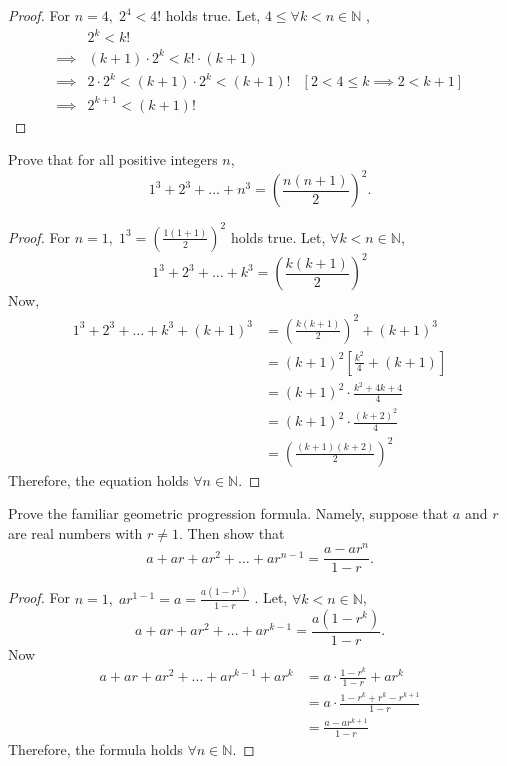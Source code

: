 \documentclass[12pt]{article}
\newenvironment{problem}[2][Problem]{\begin{trivlist}
\item[\hskip \labelsep {\bfseries #1}\hskip \labelsep {\bfseries #2.}]}{\end{trivlist}}
\begin{document}
\begin{proof}
For $n = 4, \; 2^4 < 4!$ holds true. 
Let, $4 \leq \forall k < n \in \mathbb{N}$ , 
\begin{align*}
    & 2^k < k! \\
    \implies & (k+1) \cdot 2^k < k!\cdot (k+1) \\
    \implies & 2\cdot 2^k < (k+1)\cdot 2^k < (k+1)! & [2 < 4 \leq k \implies 2 < k + 1] \\
    \implies & 2^{k+1} < (k+1)!
\end{align*}

\end{proof}

\begin{problem}{6}
Prove that for all positive integers \( n \),
\[
1^3 + 2^3 + \dots + n^3 = \left( \frac{n(n + 1)}{2} \right)^2.
\]

\end{problem}

\begin{proof}
For $n = 1, \; 1^3 = (\frac{1(1+1)}{2})^2$ holds true. 
Let, $\forall k < n \in \mathbb{N}$, 
\[
1^3 + 2^3 + \dots + k^3 = \left( \frac{k(k + 1)}{2} \right)^2
\]
Now, \\
\begin{align*}
    1^3 + 2^3 + \dots + k^3 + (k+1)^3 & = \left( \frac{k(k + 1)}{2} \right)^2 + (k+1)^3 \\
    & = (k+1)^2[\frac{k^2}{4} + (k+1)] \\
    & = (k+1)^2 \cdot \frac{k^2 + 4k +4}{4} \\
    & = (k+1)^2 \cdot \frac{(k+2)^2}{4} \\
    & = \left( \frac{(k+1)(k+2)}{2} \right)^2
\end{align*}
Therefore, the equation holds $\forall n \in \mathbb{N}$.

\end{proof}

\begin{problem}{7}
Prove the familiar geometric progression formula. Namely, suppose that \( a \) and \( r \)
are real numbers with \( r \neq 1 \). Then show that
\[
a + ar + ar^2 + \dots + ar^{n-1} = \frac{a - a r^n}{1 - r}.
\]

\end{problem}

\begin{proof}
For $n = 1, \; ar^{1-1} = a = \frac{a(1-r^1)}{1-r}$ . 
Let, $\forall k < n \in \mathbb{N}$,
\[
a + ar + ar^2 + \dots + ar^{k-1} = \frac{a(1 - r^k)}{1 - r}.
\]
Now \\
\begin{align*}
a + ar + ar^2 + \dots + ar^{k-1} + ar^k & = a \cdot \frac{1 - r^k}{1 - r} + ar^k \\
& = a \cdot \frac{1 - r^k + r^k - r^{k+1}}{1 - r} \\
& = \frac{a - ar^{k+1}}{1 - r}
\end{align*}
Therefore, the formula holds $\forall n \in \mathbb{N}$.

\end{proof}
\end{document}
